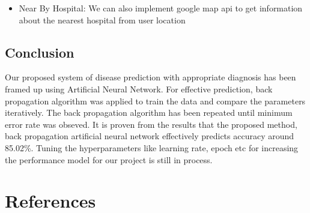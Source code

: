 {\begin{itemize}
   \item Near By Hospital: We can also implement google map api to get information about the nearest hospital from user location
        
\end{itemize}

\section{Conclusion}
 
Our proposed system of disease prediction with appropriate diagnosis has 
been framed up using Artificial Neural Network. For effective prediction, 
back propagation algorithm was applied to train the data and compare the 
parameters iteratively. The back propagation algorithm has been repeated until 
minimum error rate was obseved. It is proven from the results that the proposed 
method, back propagation artificial neural network effectively predicts accuracy 
around 85.02\%. Tuning the hyperparameters like learning rate, epoch etc for 
increasing the performance model for our project is still in process. 





\chapter*{References}

}
